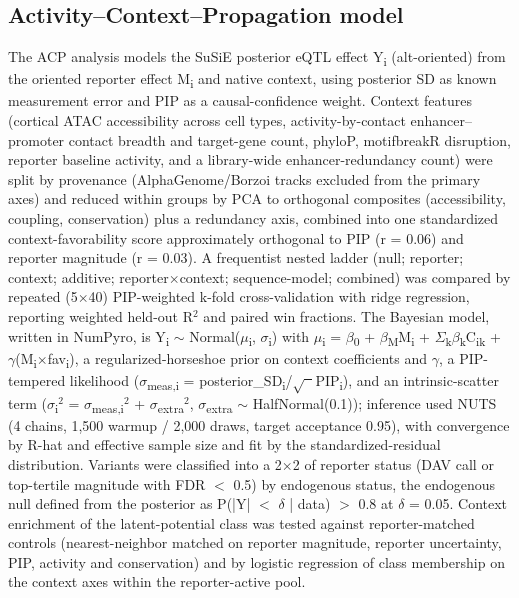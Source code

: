 \documentclass[9pt,twocolumn]{article}
\begin{document}
\subsection{Activity--Context--Propagation model}

The ACP analysis models the SuSiE posterior eQTL effect Y\textsubscript{i} (alt-oriented) from the oriented reporter effect M\textsubscript{i} and native context, using posterior SD as known measurement error and PIP as a causal-confidence weight. Context features (cortical ATAC accessibility across cell types, activity-by-contact enhancer--promoter contact breadth and target-gene count, phyloP, motifbreakR disruption, reporter baseline activity, and a library-wide enhancer-redundancy count) were split by provenance (AlphaGenome/Borzoi tracks excluded from the primary axes) and reduced within groups by PCA to orthogonal composites (accessibility, coupling, conservation) plus a redundancy axis, combined into one standardized context-favorability score approximately orthogonal to PIP (r = 0.06) and reporter magnitude (r = 0.03). A frequentist nested ladder (null; reporter; context; additive; reporter$\times$context; sequence-model; combined) was compared by repeated (5$\times$40) PIP-weighted k-fold cross-validation with ridge regression, reporting weighted held-out R$^2$ and paired win fractions. The Bayesian model, written in NumPyro, is Y\textsubscript{i} $\sim$ Normal($\mu$\textsubscript{i}, $\sigma$\textsubscript{i}) with $\mu$\textsubscript{i} = $\beta$\textsubscript{0} + $\beta$\textsubscript{M}M\textsubscript{i} + $\Sigma$\textsubscript{k}$\beta$\textsubscript{k}C\textsubscript{ik} + $\gamma$(M\textsubscript{i}$\times$fav\textsubscript{i}), a regularized-horseshoe prior on context coefficients and $\gamma$, a PIP-tempered likelihood ($\sigma$\textsubscript{meas,i} = posterior_SD\textsubscript{i}/$\sqrt{\phantom{x}}$PIP\textsubscript{i}), and an intrinsic-scatter term ($\sigma$\textsubscript{i}$^2$ = $\sigma$\textsubscript{meas,i}$^2$ + $\sigma$\textsubscript{extra}$^2$, $\sigma$\textsubscript{extra} $\sim$ HalfNormal(0.1)); inference used NUTS (4 chains, 1,500 warmup / 2,000 draws, target acceptance 0.95), with convergence by R-hat and effective sample size and fit by the standardized-residual distribution. Variants were classified into a 2$\times$2 of reporter status (DAV call or top-tertile magnitude with FDR $<$ 0.5) by endogenous status, the endogenous null defined from the posterior as P(|Y| $<$ $\delta$ | data) $>$ 0.8 at $\delta$ = 0.05. Context enrichment of the latent-potential class was tested against reporter-matched controls (nearest-neighbor matched on reporter magnitude, reporter uncertainty, PIP, activity and conservation) and by logistic regression of class membership on the context axes within the reporter-active pool.
\end{document}
